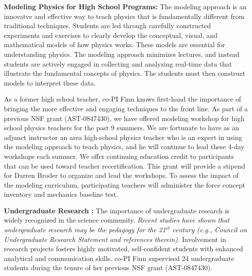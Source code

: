 \documentclass[11pt, preprint]{aastex}
\begin{document}
{{\bf Modeling Physics for High School Programs:  }
The modeling
approach is an innovatve and effective way to teach physics that is 
fundamentally different from traditional techniques.  Students are led through
carefully constructed experiments and exercises to clearly develop the conceptual, 
visual, and mathematical models of how physics works.  
These models are essential for understanding physics.
The modeling approach minimizes lectures, and instead 
students are actively engaged in collecting and analyzing real-time data
that illustrate the fundamental concepts of physics.   The students must
then construct models to interpret these
data.  

As a former high school teacher, co-PI Finn knows first-hand the importance of 
bringing the more effective and engaging techniques to the front line.
As part of a previous NSF grant (AST-0847430), we have offered 
modeling workshop for high school physics teachers for the past 9 summers.
We are fortunate
to have as an adjunct instructor an area high-school physics teacher who
is an expert in using the modeling approach to teach physics, and
he will continue to lead these 4-day workshops each summer.  
We offer continuing education credit to participants 
that can be used toward teacher recertification.
This grant will provide a stipend for Darren Broder to organize and lead
the workshops.  
To assess the impact of the modeling curriculum, participating teachers
will administer the force concept inventory and mechanics baseline test.


{\bf Undergraduate Research  :}
The importance of undergraduate research is widely recognized
in the science community.
{\em Recent studies have shown that undergraduate research may be the
pedagogy for the 21$^{st}$ century (e.g., Council on Undergraduate Research
Statement and references therein).}
Involvement in research projects
fosters highly motivated, self-confident students with enhanced
analytical and communication skills. 
co-PI Finn supervised 24 undergraduate students during the tenure of her
previous NSF grant (AST-0847430).

}
\end{document}
